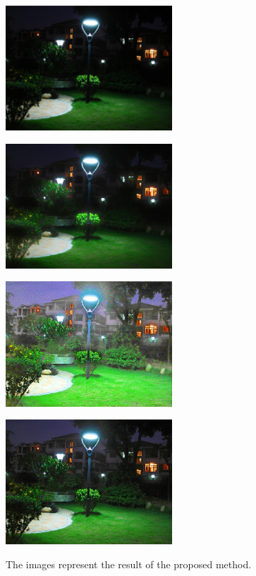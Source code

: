 \begin{figure}[htbp]
\centering
	\begin{minipage}[b]{0.49\hsize}
		\centering
		\includegraphics[width=62.5mm]{images/proposed/input.eps}
		 \label{fig:proposed/input}
	\end{minipage}
	\begin{minipage}[b]{0.49\hsize}
		\centering
		\includegraphics[width=62.5mm]{images/proposed/illumination.eps}
		 \label{fig:proposed/illumination}
	\end{minipage}
	\begin{minipage}[b]{0.49\hsize}
		\centering
		\includegraphics[width=62.5mm]{images/proposed/reflectance.eps}
		 \label{fig:proposed/reflectance}
	\end{minipage}
	\begin{minipage}[b]{0.49\hsize}
		\centering
		\includegraphics[width=62.5mm]{images/proposed/output.eps}
		 \label{fig:proposed/enhanced}
	\end{minipage}
	\caption{The images represent the result of the proposed method.}
	\label{fig:proposed/output}
\end{figure}